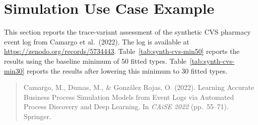 \documentclass[11pt,a4paper]{article}
\begin{document}


\section{Simulation Use Case Example}
\label{sec:simulation-example}

This section reports the trace-variant assessment of the synthetic CVS pharmacy event log from Camargo et al.\ (2022). The log is available at \url{https://zenodo.org/records/5734443}. Table~\ref{tab:synth-cvs-min50} reports the results using the baseline minimum of 50 fitted types. Table~\ref{tab:synth-cvs-min30} reports the results after lowering this minimum to 30 fitted types.

\begin{quote}
Camargo, M., Dumas, M., \& Gonz\'alez Rojas, O. (2022).
Learning Accurate Business Process Simulation Models from Event Logs via Automated Process Discovery and Deep Learning.
In \textit{CAiSE 2022} (pp.~55--71). Springer.
\end{quote}

\begin{table}[H]
\centering
\caption{Power-law analysis results per log at variant level for the synthetic
CVS pharmacy log, with a minimum of 50 fitted types.}
\label{tab:synth-cvs-min50}
\setlength{\tabcolsep}{2pt}%

\end{table}

\begin{table}[H]
\centering
\caption{Power-law analysis results per log at variant level for the synthetic
CVS pharmacy log, with a minimum of 30 fitted types.}
\label{tab:synth-cvs-min30}
\setlength{\tabcolsep}{2pt}%

\end{table}
\FloatBarrier
\end{document}
